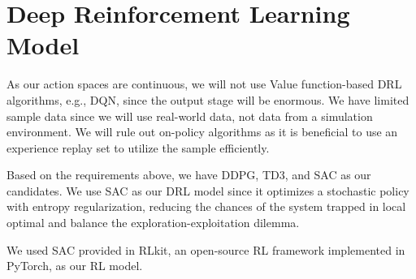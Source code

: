 \section{Deep Reinforcement Learning Model}
As our action spaces are continuous, we will not use Value function-based DRL algorithms, e.g., DQN, since the output stage will be enormous. We have limited sample data since we will use real-world data, not data from a simulation environment. We will rule out on-policy algorithms as it is beneficial to use an experience replay set to utilize the sample efficiently.
\par
Based on the requirements above, we have DDPG, TD3, and SAC as our candidates. We use SAC as our DRL model since it optimizes a stochastic policy with entropy regularization, reducing the chances of the system trapped in local optimal and balance the exploration-exploitation dilemma.

We used SAC \cite{haarnoja2018soft} provided in RLkit, an open-source RL framework implemented in PyTorch\cite{pongrlkit}, as our RL model.
\
